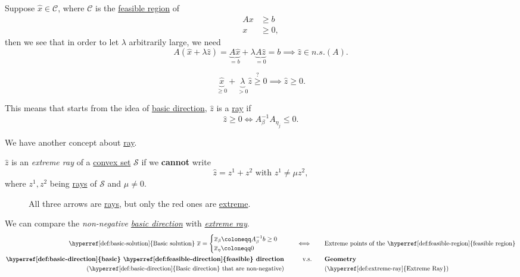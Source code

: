 Suppose \(\hat{x}\in\mathcal{C}\), where \(\mathcal{C}\) is the \hyperref[def:feasible-region]{feasible region} of
\begin{align*}
	Ax & \geq b  \\
	x  & \geq 0,
\end{align*}
then we see that in order to let \(\lambda\) arbitrarily large, we need
\[
	A(\hat{x} + \lambda \hat{z}) = \underbrace{A \hat{x}}_{=b} + \lambda \underbrace{A \hat{z}}_{=0} = b\implies \hat{z} \in n.s.(A).
\]

\begin{problem}
\[
	\underbrace{\hat{x}}_{\geq 0} + \underbrace{\lambda}_{>0} \hat{z} \overset{?}{\geq} 0 \implies \hat{z} \geq 0.
\]
\end{problem}

This means that starts from the idea of \hyperref[def:basic-direction]{basic direction}, \(\hat{z}\) is a \hyperref[def:ray]{ray} if
\[
	\hat{z} \geq 0 \iff A^{-1}_{\beta}A_{\eta_j} \leq 0.
\]

We have another concept about \hyperref[def:ray]{ray}.
\begin{definition}\label{def:extreme-ray}
	\(\hat{z}\) is an \emph{extreme ray} of a \hyperref[def:convex-set]{convex set} \(\mathcal{S}\) if we \textbf{cannot} write
	\[
		\hat{z} = z^1 + z^2 \text{ with }z^1 \neq \mu z^2,
	\]
	where \(z^1, z^2\) being \hyperref[def:ray]{rays} of \(\mathcal{S}\) and \(\mu\neq 0\).
	\begin{figure}[H]
		\centering
		\caption{All three arrows are \hyperref[def:ray]{rays}, but only the red ones are \hyperref[def:extreme-ray]{extreme}.}
		\label{fig:extreme-ray}
	\end{figure}
\end{definition}

\begin{remark}
	We can compare the \emph{non-negative \hyperref[def:basic-direction]{basic direction}} with \emph{\hyperref[def:extreme-ray]{extreme ray}}.
	\[
		\begin{alignedat}{4}
			\text{\hyperref[def:basic-solution]{Basic solution} }\overline{x}=\begin{cases}
				\overline{x}_{\beta}\coloneqq A^{-1}_{\beta}b\geq 0 \\
				\overline{x}_{\eta} \coloneqq 0
			\end{cases} &&\qquad\iff\qquad&\text{Extreme points of the \hyperref[def:feasible-region]{feasible region}}\\
			\text{\textbf{\hyperref[def:basic-direction]{basic} \hyperref[def:feasible-direction]{feasible} direction}} && \qquad \text{v.s.}\qquad&\text{\textbf{Geometry}}\\
			\text{(\hyperref[def:basic-direction]{Basic direction} that are non-negative)}&& &\text{(\hyperref[def:extreme-ray]{Extreme Ray})}
		\end{alignedat}
	\]
\end{remark}